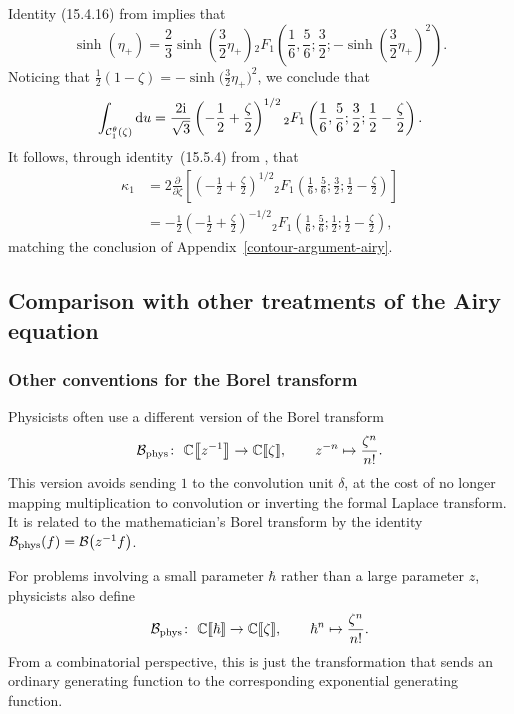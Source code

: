 \documentclass[pdftex]{sigma}
\newcommand{\maps}{\colon}
\newcommand{\C}{\mathbb{C}}
\newcommand{\borel}{\mathcal{B}}
\numberwithin{equation}{section}
\begin{document}
Identity (15.4.16) from \cite{dlmf} implies that
\[ \sinh(\eta_+) = \frac{2}{3} \sinh\left(\frac{3}{2}\eta_+\right) {}_2 F_1\left(\frac{1}{6}, \frac{5}{6}; \frac{3}{2}; -\sinh\left(\frac{3}{2}\eta_+\right)^2\right). \]
Noticing that $\frac{1}{2}(1 - \zeta) = -\sinh\bigl(\frac{3}{2}\eta_+\bigr)^2$, we conclude that
\[ \int_{\mathcal{C}_1^\theta(\zeta)} {\rm d}u = \frac{2{\rm i}}{\sqrt{3}} \left(-\frac{1}{2} + \frac{\zeta}{2}\right)^{1/2} {}_2 F_1\left(\frac{1}{6}, \frac{5}{6}; \frac{3}{2}; \frac{1}{2} - \frac{\zeta}{2}\right). \]
It follows, through identity~(15.5.4) from \cite{dlmf}, that
\begin{align*}
\kappa_1 & = 2 \frac{\partial}{\partial \zeta} \left[ \left(-\frac{1}{2} + \frac{\zeta}{2}\right)^{1/2} {}_2 F_1\left(\frac{1}{6}, \frac{5}{6}; \frac{3}{2}; \frac{1}{2} - \frac{\zeta}{2}\right) \right] \\
& = -\frac{1}{2} \left(-\frac{1}{2} + \frac{\zeta}{2}\right)^{-1/2} {}_2 F_1\left(\frac{1}{6}, \frac{5}{6}; \frac{1}{2}; \frac{1}{2} - \frac{\zeta}{2}\right),
\end{align*}
matching the conclusion of Appendix~\ref{contour-argument-airy}.
%
\subsection{Comparison with other treatments of the Airy equation}\label{airy-comparison}
%
\subsubsection{Other conventions for the Borel transform}
%
Physicists often use a different version of the Borel transform
\begin{align*}
\borel_{{\rm phys}} \maps \ \C \big\llbracket z^{-1} \big\rrbracket \to \C \llbracket \zeta \rrbracket ,\qquad
z^{-n} \mapsto \frac{\zeta^n}{n!}.
\end{align*}
This version avoids sending $1$ to the convolution unit $\delta$, at the cost of no longer mapping multiplication to convolution or inverting the formal Laplace transform. It is related to the mathematician's Borel transform by the identity $\borel_{\rm phys}(f) = \borel\bigl(z^{-1} f\bigr)$.

For problems involving a small parameter $\hbar$ rather than a large parameter $z$, physicists also define
\begin{align*}
\borel_{{\rm phys}} \maps\ \C \llbracket \hbar \rrbracket \to \C \llbracket \zeta \rrbracket ,\qquad
\hbar^n \mapsto \frac{\zeta^n}{n!}.
\end{align*}
From a combinatorial perspective, this is just the transformation that sends an ordinary generating function to the corresponding exponential generating function.
\end{document}
